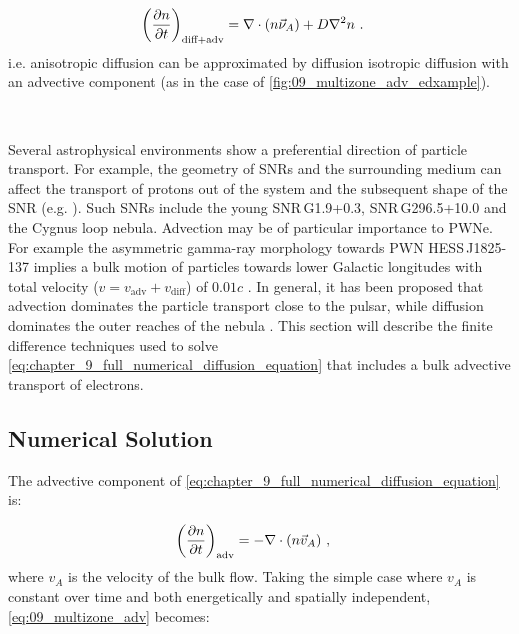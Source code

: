  \begin{equation}
     \begin{aligned}
         \qty(\pdv{n}{t})_\text{diff+adv}&=\nabla\cdot\qty(n\vec{\nu}_A)+D\nabla^2 n\text{ .} 
     \end{aligned}
 \end{equation}
\noindent i.e. anisotropic diffusion can be approximated by diffusion isotropic diffusion with an advective component (as in the case of \autoref{fig:09_multizone_adv_edxample}).
\par~\par 
Several astrophysical environments show a preferential direction of particle transport. For example, the geometry of SNRs and the surrounding medium can affect the transport of protons out of the system and the subsequent shape of the SNR (e.g. \cite{2015MNRAS.450.3080M,2021ApJ...923..233G}). Such SNRs include the young \mbox{SNR\,G1.9+0.3}, \mbox{SNR\,G296.5+10.0} and the Cygnus loop nebula. Advection may be of particular importance to PWNe. For example the asymmetric gamma-ray morphology towards PWN \mbox{HESS\,J1825-137} \citep{2019A&A...621A.116H} implies a bulk motion of particles towards lower Galactic longitudes with total velocity ($v=v_\text{adv}+v_\text{diff}$) of $0.01c$ \citep{2019A&A...621A.116H}. In general, it has been proposed that advection dominates the particle transport close to the pulsar, while diffusion dominates the outer reaches of the nebula \citep{2020A&A...636A.113G,2021PhRvD.104l3017R}. This section will describe the finite difference techniques used to solve \autoref{eq:chapter_9_full_numerical_diffusion_equation} that includes a bulk advective transport of electrons.

\subsection{Numerical Solution} \label{sec:09_multizone_advection_num_sol}

The advective component of \autoref{eq:chapter_9_full_numerical_diffusion_equation} is:

\begin{equation}
    \begin{aligned}
    \qty(\pdv{n}{t})_\text{adv}&=-\nabla\cdot\qty(n\vec{v}_A)\text{ ,} 
    \end{aligned} \label{eq:09_multizone_adv}
\end{equation}
\noindent where $v_A$ is the velocity of the bulk flow. Taking the simple case where $v_A$ is constant over time and both energetically and spatially independent, \autoref{eq:09_multizone_adv} becomes:

